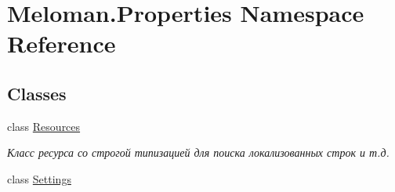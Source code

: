 \hypertarget{namespace_meloman_1_1_properties}{}\section{Meloman.\+Properties Namespace Reference}
\label{namespace_meloman_1_1_properties}
\subsection*{Classes}
\begin{DoxyCompactItemize}
\item 
class \mbox{\hyperlink{class_meloman_1_1_properties_1_1_resources}{Resources}}
\begin{DoxyCompactList}\small\item\em Класс ресурса со строгой типизацией для поиска локализованных строк и т.\+д. \end{DoxyCompactList}\item 
class \mbox{\hyperlink{class_meloman_1_1_properties_1_1_settings}{Settings}}
\end{DoxyCompactItemize}
